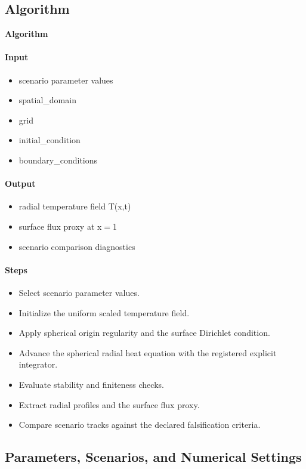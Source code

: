 \documentclass[11pt]{article}
\begin{document}
\subsection{Algorithm}

\noindent\textbf{Algorithm}
\paragraph{Input}
\begin{itemize}\raggedright
\item scenario parameter values
\item spatial\_\allowbreak{}domain
\item grid
\item initial\_\allowbreak{}condition
\item boundary\_\allowbreak{}conditions
\end{itemize}
\paragraph{Output}
\begin{itemize}\raggedright
\item radial temperature field T(x,t)
\item surface flux proxy at x\ensuremath{=}1
\item scenario comparison diagnostics
\end{itemize}
\paragraph{Steps}
\begin{itemize}\raggedright
\item Select scenario parameter values.
\item Initialize the uniform scaled temperature field.
\item Apply spherical origin regularity and the surface Dirichlet condition.
\item Advance the spherical radial heat equation with the registered explicit integrator.
\item Evaluate stability and finiteness checks.
\item Extract radial profiles and the surface flux proxy.
\item Compare scenario tracks against the declared falsification criteria.
\end{itemize}

\subsection{Parameters, Scenarios, and Numerical Settings}
\end{document}
